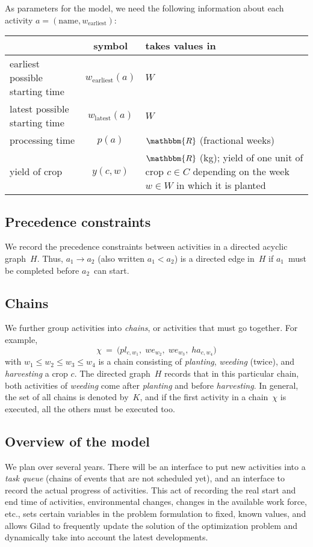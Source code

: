 \documentclass[11pt,reqno]{amsart}
\newcommand{\RR}{\mathbbm{R}}
\newcommand{\lra}{\longrightarrow}
\numberwithin{equation}{section}
\begin{document}
As parameters for the model, we need the following information about each activity $a=(\text{name}, w_{\text{earliest}})$:
\begin{center}
  \begin{tabular}{lcp{8cm}}
    & symbol & takes values in\\\hline 
    earliest possible starting time & $w_{\text{earliest}}(a)$ & $W$ \\ 
    latest possible starting time & $w_{\text{latest}}(a)$ & $W$ \\ 
    processing time & $p(a)$ & $\RR$ (fractional weeks)\\ 
    yield of crop & $y(c,w)$ & $\RR$ (kg); yield of one unit of crop $c\in C$
    depending on the week $w\in W$ in which it is planted\\\hline
  \end{tabular}
\end{center}

\subsection{Precedence constraints}

We record the precedence constraints between  activities in a directed acyclic
graph~$H$. Thus, $a_1\lra a_2$ (also written $a_1<a_2$) is a directed edge
in~$H$ if $a_1$~must be completed before $a_2$~can start. 

\subsection{Chains}
We further group activities into \emph{chains}, or activities that must go
together. For example,
\[
   \chi
   \ = \
   \big(pl_{c,w_1}, \;
    we_{w_2},\;
    we_{w_3},\;
    ha_{c,w_4}\big)
\]
with $w_1\le w_2\le w_3\le w_4$ is a chain consisting of \emph{planting}, \emph{weeding}
(twice), and \emph{harvesting} a crop $c$. The directed graph~$H$ records that in this
particular chain, both activities of \emph{weeding} come after \emph{planting} and before
\emph{harvesting}. In general, the set of all chains is denoted by~$K$, and if the first
activity in a chain~$\chi$ is executed, all the others must be executed too.



\subsection{Overview of the model}

We plan over several years. There will be an interface to put new activities into a
\emph{task queue} (chains of events that are not scheduled yet), and an interface to
record the actual progress of activities. This act of recording the real start and end
time of activities, environmental changes, changes in the available work force, etc., sets
certain variables in the problem formulation to fixed, known values, and allows Gilad to
frequently update the solution of the optimization problem and dynamically take into
account the latest developments.
\end{document}
